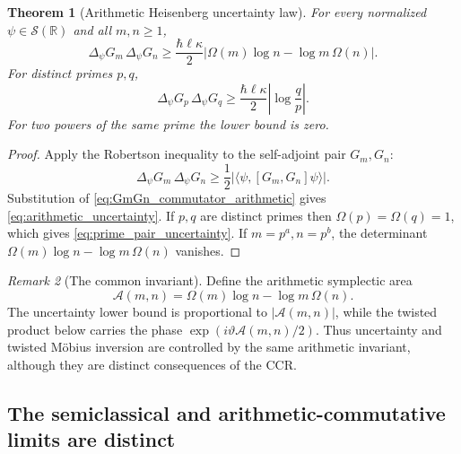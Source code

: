 \documentclass[11pt]{amsart}
\numberwithin{equation}{section}
\theoremstyle{plain}
\newtheorem{theorem}{Theorem}[section]
\theoremstyle{definition}
\theoremstyle{remark}
\newtheorem{remark}[theorem]{Remark}
\newcommand{\R}{\mathbb{R}}
\newcommand{\Sch}{\mathcal{S}}
\begin{document}
\begin{theorem}[Arithmetic Heisenberg uncertainty law]
\label{thm:arithmetic_uncertainty}
For every normalized \(\psi\in\Sch(\R)\) and all \(m,n\ge1\),
\begin{equation}
\boxed{
\Delta_\psi G_m\,\Delta_\psi G_n
\ge
\frac{\hbar\ell\kappa}{2}
\left|\Omega(m)\log n-\log m\,\Omega(n)\right|.}
\label{eq:arithmetic_uncertainty}
\end{equation}
For distinct primes \(p,q\),
\begin{equation}
\boxed{
\Delta_\psi G_p\,\Delta_\psi G_q
\ge
\frac{\hbar\ell\kappa}{2}
\left|\log\frac{q}{p}\right|.}
\label{eq:prime_pair_uncertainty}
\end{equation}
For two powers of the same prime the lower bound is zero.
\end{theorem}

\begin{proof}
Apply the Robertson inequality to the self-adjoint pair \(G_m,G_n\):
\begin{equation}
\Delta_\psi G_m\,\Delta_\psi G_n
\ge
\frac12
\left|\langle\psi,[G_m,G_n]\psi\rangle\right|.
\label{eq:Robertson_GmGn}
\end{equation}
Substitution of \eqref{eq:GmGn_commutator_arithmetic} gives
\eqref{eq:arithmetic_uncertainty}.  If \(p,q\) are distinct primes then
\(\Omega(p)=\Omega(q)=1\), which gives \eqref{eq:prime_pair_uncertainty}.
If \(m=p^a,n=p^b\), the determinant
\(\Omega(m)\log n-\log m\,\Omega(n)\) vanishes.
\end{proof}

\begin{remark}[The common invariant]
\label{rem:common_symplectic_invariant}
Define the arithmetic symplectic area
\begin{equation}
\mathcal A(m,n)
=
\Omega(m)\log n-\log m\,\Omega(n).
\label{eq:arithmetic_symplectic_area}
\end{equation}
The uncertainty lower bound is proportional to \( |\mathcal A(m,n)| \),
while the twisted product below carries the phase
\(\exp(i\vartheta\mathcal A(m,n)/2)\).  Thus uncertainty and twisted
M\"obius inversion are controlled by the same arithmetic invariant, although
they are distinct consequences of the CCR.
\end{remark}

\subsection{The semiclassical and arithmetic-commutative limits are distinct}
\label{subsec:two_limits}
\end{document}
